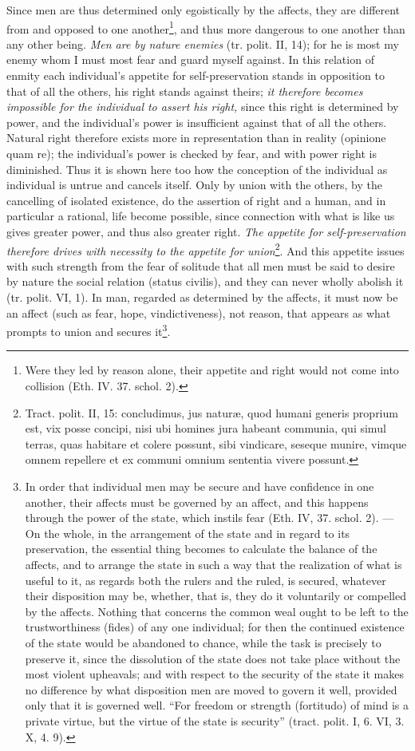 \documentclass[12pt,a4paper,openany]{book}
\newcommand{\opage}[1]{\marginnote{\footnotesize\textit{[#1]}}}
\begin{document}
Since men are thus determined only egoistically by the affects, they are different from and opposed to one another\footnote{Were they led by reason alone, their appetite and right would not come into collision (Eth. IV. 37. schol. 2).}, and thus more dangerous to one another than any other being. \emph{Men are by nature enemies} (tr. polit. II, 14); for he is most my enemy whom I must most fear and guard myself against. In this relation of enmity each individual's appetite for self-preservation stands in opposition to that of all the others, his right stands against theirs; \emph{it therefore becomes impossible for the individual to assert his right,} since this right is determined by power, and the individual's power is
\opage{136}\setcounter{footnote}{0}insufficient against that of all the others. Natural right therefore exists more in representation than in reality (opinione quam re); the individual's power is checked by fear, and with power right is diminished. Thus it is shown here too how the conception of the individual as individual is untrue and cancels itself. Only by union with the others, by the cancelling of isolated existence, do the assertion of right and a human, and in particular a rational, life become possible, since connection with what is like us gives greater power, and thus also greater right. \emph{The appetite for self-preservation therefore drives with necessity to the appetite for union}\footnote{Tract. polit. II, 15: concludimus, jus naturæ, quod humani generis proprium est, vix posse concipi, nisi ubi homines jura habeant communia, qui simul terras, quas habitare et colere possunt, sibi vindicare, seseque munire, vimque omnem repellere et ex communi omnium sententia vivere possunt.}. And this appetite issues with such strength from the fear of solitude that all men must be said to desire by nature the social relation (status civilis), and they can never wholly abolish it (tr. polit. VI, 1). In man, regarded as determined by the affects, it must now be an affect (such as fear, hope, vindictiveness), not reason, that appears as what prompts to union and secures it\footnote{In order that individual men may be secure and have confidence in one another, their affects must be governed by an affect, and this happens through the power of the state, which instils fear (Eth. IV, 37. schol. 2). --- On the whole, in the arrangement of the state and in regard to its preservation, the essential thing becomes to calculate the balance of the affects, and to arrange the state in such a way that the realization of what is useful to it, as regards both the rulers and the ruled, is secured, whatever their disposition may be, whether, that is, they do it voluntarily or compelled by the affects. Nothing that concerns the common weal ought to be left to the trustworthiness (fides) of any one individual; for then the continued existence of the state would be abandoned to chance, while the task is precisely to preserve it, since the dissolution of the state does not take place without the most violent upheavals; and with respect to the security of the state it makes no difference by what disposition men are moved to govern it well, provided only that it is governed well. ``For freedom or strength (fortitudo) of mind is a private virtue, but the virtue of the state is security'' (tract. polit. I, 6. VI, 3. X, 4. 9).}.
\end{document}
